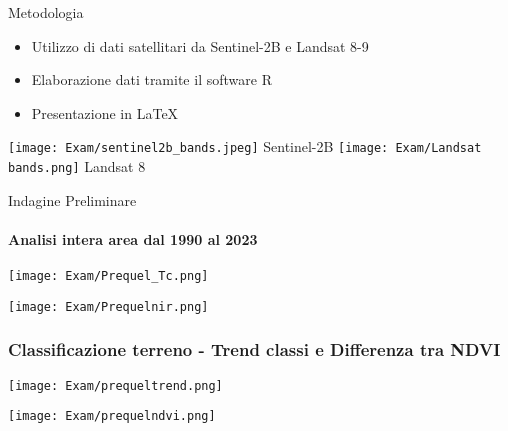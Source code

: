 \documentclass{beamer}  %
\begin{document}
\begin{frame}{Metodologia}
    \begin{itemize}
        \item Utilizzo di dati satellitari da Sentinel-2B e Landsat 8-9 
        \item Elaborazione dati tramite il software R
        \item Presentazione in \LaTeX
    \end{itemize}
    \vspace{0.5cm}
    \centering
    \texttt{[image: Exam/sentinel2b\_bands.jpeg]}
    {\tiny Sentinel-2B}
    \vspace{0.2cm}
    \texttt{[image: Exam/Landsat bands.png]}
    {\tiny Landsat 8}
\end{frame}

\begin{frame}[fragile]{Indagine Preliminare}
 \framesubtitle{Analisi intera area dal 1990 al 2023}
 \begin{center} 
            \texttt{[image: Exam/Prequel\_Tc.png]}
       \end{center}
            \vspace{0.1cm}
             \begin{center} 
                \texttt{[image: Exam/Prequelnir.png]}
\end{center}
     \end{frame}
 
\begin{frame}[fragile]
    \frametitle{\scriptsize Classificazione terreno - Trend classi e Differenza tra NDVI}
 \begin{center} 
            \texttt{[image: Exam/prequeltrend.png]}
            \end{center}
             \begin{center} 

             \vspace{0.5cm}
                \texttt{[image: Exam/prequelndvi.png]}
\end{center}
     \end{frame}
\end{document}
